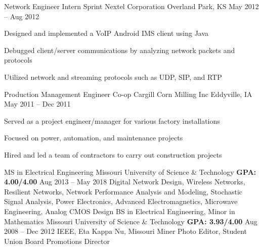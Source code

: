 \documentclass[]{awesome-cv}
\begin{document}
\begin{cventries}
{\begin{cvitems}
		\end{cvitems}}
	\cventry
	{Network Engineer Intern}
	{Sprint Nextel Corporation}
	{Overland Park, KS}
	{May 2012 – Aug 2012}
	{\begin{cvitems}
		\item {Designed and implemented a VoIP Android IMS client using Java}
		\item {Debugged client/server communications by analyzing network packets and protocols}
		\item {Utilized network and streaming protocols such as UDP, SIP, and RTP}
		\end{cvitems}}
	\cventry
	{Production Management Engineer Co-op}
	{Cargill Corn Milling Inc}
	{Eddyville, IA}
	{May 2011 – Dec 2011}
	{\begin{cvitems}
		\item {Served as a project engineer/manager for various factory installations}
		\item {Focused on power, automation, and maintenance projects}
		\item {Hired and led a team of contractors to carry out construction projects}
		\end{cvitems}}
\end{cventries}

\vspace*{0mm}

\begin{cventries}
	\cventry
	{MS in Electrical Engineering}
	{Missouri University of Science \& Technology}
	{\bfseries GPA: 4.00/4.00}
	{Aug 2013 – May 2018}
	{Digital Network Design, Wireless Networks, Resilient Networks, Network Performance Analysis and Modeling, \newline Stochastic Signal Analysis, Power Electronics, Advanced Electromagnetics, Microwave Engineering, Analog CMOS Design}
	\cventry
	{BS in Electrical Engineering, Minor in Mathematics}
	{Missouri University of Science \& Technology}
	{\bfseries GPA: 3.93/4.00}
	{Aug 2008 – Dec 2012}
	{IEEE, Eta Kappa Nu, Missouri Miner Photo Editor, Student Union Board Promotions Director} %
\end{cventries}

\vspace*{0mm}
\end{document}

